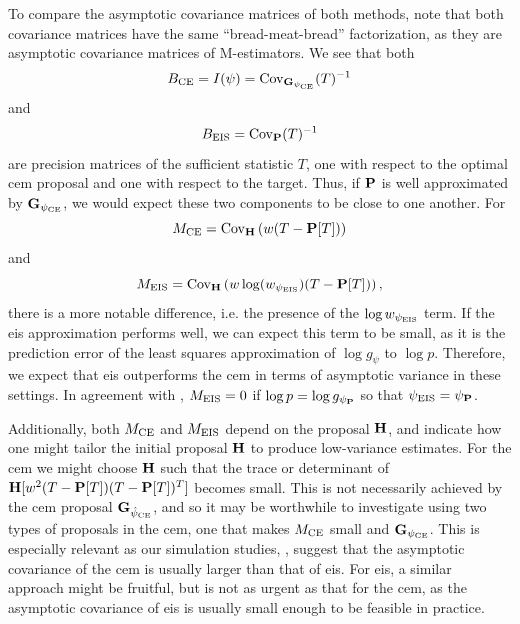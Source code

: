To compare the asymptotic covariance matrices of both methods, note that both covariance matrices have the same ``{}bread-meat-bread''{} factorization, as they are asymptotic covariance matrices of M-estimators. We see that both $$B_{\ce} = I(\psi) = \cov_{\G_{\pce}}(T)^{-1}$$ and $$B_{\eis} = \cov_{\P}(T)^{-1}$$ are precision matrices of the sufficient statistic $T$, one with respect to the optimal \gls{cem} proposal and one with respect to the target. Thus, if $\P$ is well approximated by $\G_{\pce}$, we would expect these two components to be close to one another. 
For $$M_{\ce} = \cov_{\H} \left( w (T - \P[T]) \right)$$ and $$M_{\eis} = \cov_{\H}\left( w \log (w_{\peis})(T-\P[T]) \right),$$ there is a more notable difference, i.e. the presence of the $\log w_{\peis}$ term. If the \gls{eis} approximation performs well, we can expect this term to be small, as it is the prediction error of the least squares approximation of $\log g_{\psi}$ to $\log p$. Therefore, we expect that \gls{eis} outperforms the \gls{cem} in terms of asymptotic variance in these settings. In agreement with , $M_{\eis} = 0$ if $\log p = \log g_{\psi_{\P}}$ so that $\peis = \psi_{\P}$.

Additionally, both $M_{\ce}$ and $M_{\eis}$ depend on the proposal $\H$, and indicate how one might tailor the initial proposal $\H$ to produce low-variance estimates. For the \gls{cem} we might choose $\H$ such that the trace or determinant of $\H [w^{2} (T - \P[T]) (T - \P [T])^{T}]$ becomes small. This is not necessarily achieved by the \gls{cem} proposal $\G_{\hpce}$, and so it may be worthwhile to investigate using two types of proposals in the \gls{cem}, one that makes $M_{\ce}$ small and $\G_{\pce}$. This is especially relevant as our simulation studies, , suggest that the asymptotic covariance of the \gls{cem} is usually larger than that of \gls{eis}. For \gls{eis}, a similar approach might be fruitful, but is not as urgent as that for the \gls{cem}, as the asymptotic covariance of \gls{eis} is usually small enough to be feasible in practice.

